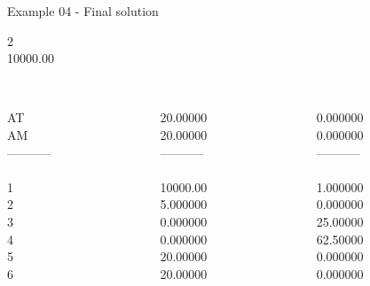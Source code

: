 \begin{frame}{Example 04 - Final solution}

  2\\
  10000.00\\

\begin{columns}[t]
\begin{column}{0.3\textwidth}
\\
AT\\
AM\\
-----------\\
\\
1\\
2\\
3\\
4\\
5\\
6\\

\end{column}
\begin{column}{0.3\textwidth}
\\
20.00000\\
20.00000\\

-----------\\
\\
10000.00\\
5.000000\\
0.000000\\
0.000000\\
20.00000\\
20.00000\\

\end{column}

\begin{column}{0.3\textwidth}
\\
0.000000\\
0.000000\\

-----------\\
\\
1.000000\\
0.000000\\
25.00000\\
62.50000\\
0.000000\\
0.000000\\
\end{column}
\end{columns}
\end{frame}
